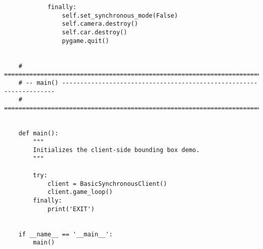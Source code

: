 \begin{lstlisting}
	        finally:
	            self.set_synchronous_mode(False)
	            self.camera.destroy()
	            self.car.destroy()
	            pygame.quit()
	
	
	# ==============================================================================
	# -- main() --------------------------------------------------------------------
	# ==============================================================================
	
	
	def main():
	    """
	    Initializes the client-side bounding box demo.
	    """
	
	    try:
	        client = BasicSynchronousClient()
	        client.game_loop()
	    finally:
	        print('EXIT')
	
	
	if __name__ == '__main__':
	    main()

\end{lstlisting}



